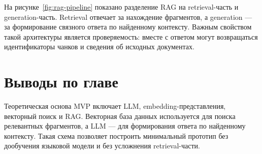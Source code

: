 На рисунке~\ref{fig:rag-pipeline} показано разделение RAG на retrieval-часть и generation-часть. Retrieval отвечает за нахождение фрагментов, а generation — за формирование связного ответа по найденному контексту. Важным свойством такой архитектуры является проверяемость: вместе с ответом могут возвращаться идентификаторы чанков и сведения об исходных документах.

\section{Выводы по главе}

Теоретическая основа MVP включает LLM, embedding-представления, векторный поиск и RAG. Векторная база данных используется для поиска релевантных фрагментов, а LLM — для формирования ответа по найденному контексту. Такая схема позволяет построить минимальный прототип без дообучения языковой модели и без усложнения retrieval-части.

